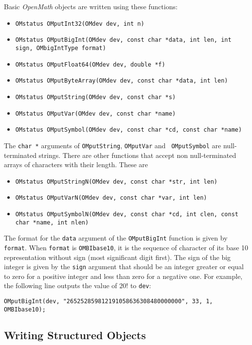 \documentclass{article}
\newcommand{\OM}{{\sl OpenMath}}
\begin{document}
Basic {\OM} objects are written using these functions:
\begin{itemize} 
\item \verb+OMstatus OMputInt32(OMdev dev, int n)+
\item \verb+OMstatus OMputBigInt(OMdev dev, const char *data, int len, int sign, OMbigIntType format)+
\item \verb+OMstatus OMputFloat64(OMdev dev, double *f)+
\item 
\verb+OMstatus OMputByteArray(OMdev dev, const char *data, int len)+
\item \verb+OMstatus OMputString(OMdev dev, const char *s)+
\item \verb+OMstatus OMputVar(OMdev dev, const char *name)+
\item \verb+OMstatus OMputSymbol(OMdev dev, const char *cd, const char *name)+
\end{itemize} 

The {\tt char *} arguments of {\tt OMputString}, {\tt OMputVar} and {\tt
OMputSymbol} are null-terminated strings. There are other functions that
accept non null-terminated arrays of characters with their length.
These are 
\begin{itemize} 
\item \verb+OMstatus OMputStringN(OMdev dev, const char *str, int len)+
\item \verb+OMstatus OMputVarN(OMdev dev, const char *var, int len)+
\item
\verb+OMstatus OMputSymbolN(OMdev dev, const char *cd, int clen, const char *name, int nlen)+
\end{itemize} 

The format for the {\tt data} argument of the {\tt OMputBigInt} function is
given by {\tt format}. When {\tt format} is {\tt OMBIbase10}, it is the
sequence of character of its base 10 representation without sign (most
significant digit first). The sign of the big integer is given by the 
{\tt sign} argument that should be an integer greater or
equal to zero for a positive integer and less than zero for a negative
one. For example, the following line outputs the value of $20!$ to {\tt dev}:
\begin{verbatim} 
OMputBigInt(dev, "265252859812191058636308480000000", 33, 1, OMBIbase10);
\end{verbatim} 

\subsection{Writing Structured Objects}
\end{document}
